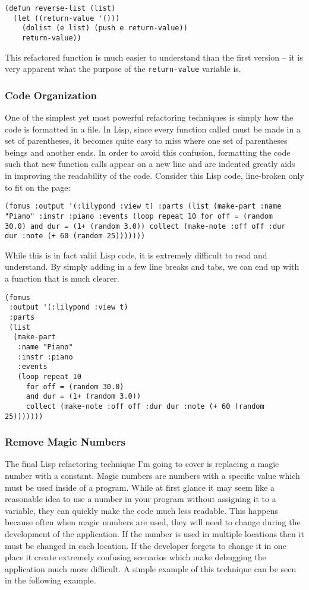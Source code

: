 \begin{verbatim}
(defun reverse-list (list)
  (let ((return-value '()))
    (dolist (e list) (push e return-value))
    return-value))
\end{verbatim}

This refactored function is much easier to understand than the first version -- it is very apparent what the purpose of the \verb!return-value! variable is.

\subsubsection{Code Organization}

One of the simplest yet most powerful refactoring techniques is simply how the code is formatted in a file. In Lisp, since every function called must be made in a set of parentheses, it becomes quite easy to miss where one set of parentheses beings and another ends. In order to avoid this confusion, formatting the code such that new function calls appear on a new line and are indented greatly aids in improving the readability of the code. Consider this Lisp code, line-broken only to fit on the page:

\begin{verbatim}
(fomus :output '(:lilypond :view t) :parts (list (make-part :name 
"Piano" :instr :piano :events (loop repeat 10 for off = (random 
30.0) and dur = (1+ (random 3.0)) collect (make-note :off off :dur 
dur :note (+ 60 (random 25)))))))
\end{verbatim}

While this is in fact valid Lisp code, it is extremely difficult to read and understand. By simply adding in a few line breaks and tabs, we can end up with a function that is much clearer.

\begin{verbatim}
(fomus
 :output '(:lilypond :view t)
 :parts
 (list
  (make-part
   :name "Piano"
   :instr :piano
   :events
   (loop repeat 10
	 for off = (random 30.0)
	 and dur = (1+ (random 3.0))
	 collect (make-note :off off :dur dur :note (+ 60 (random 25)))))))
\end{verbatim}

\subsubsection{Remove Magic Numbers}
 
The final Lisp refactoring technique I’m going to cover is replacing a magic number with a constant. Magic numbers are numbers with a specific value which must be used inside of a program. While at first glance it may seem like a reasonable idea to use a number in your program without assigning it to a variable, they can quickly make the code much less readable. This happens because often when magic numbers are used, they will need to change during the development of the application. If the number is used in multiple locations then it must be changed in each location. If the developer forgets to change it in one place it create extremely confusing scenarios which make debugging the application much more difficult. A simple example of this technique can be seen in the following example.
 
